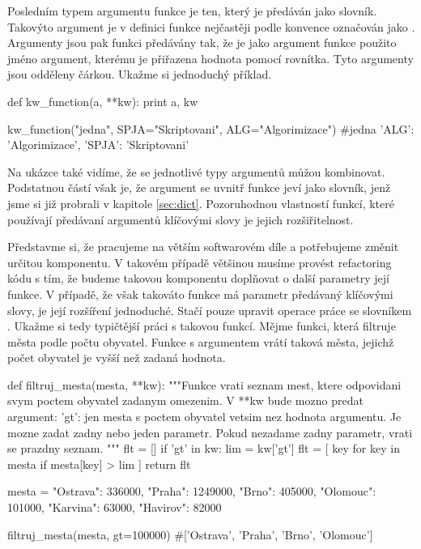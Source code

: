 Posledním typem argumentu funkce je ten, který je předáván jako slovník. Takovýto argument je
v definici funkce nejčastěji podle konvence označován jako . Argumenty jsou pak funkci
předávány tak, že je jako argument funkce použito jméno argument, kterému je přiřazena hodnota pomocí rovnítka.
Tyto argumenty jsou odděleny čárkou. Ukažme si jednoduchý příklad.

\begin{python}
def kw_function(a, **kw):
    print a, kw

kw_function("jedna", SPJA="Skriptovani", ALG="Algorimizace")
#jedna {'ALG': 'Algorimizace', 'SPJA': 'Skriptovani'}
\end{python}

Na ukázce také vidíme, že se jednotlivé typy argumentů můžou kombinovat. Podstatnou částí však je,
že argument  se uvnitř funkce jeví jako slovník, jenž jsme si již probrali v kapitole
\ref{sec:dict}. Pozoruhodnou vlastností funkcí, které používají předávaní argumentů klíčovými
slovy je jejich rozšiřitelnost.

Představme si, že pracujeme na větším softwarovém díle a potřebujeme změnit určitou
komponentu. V takovém případě většinou musíme provést refactoring kódu s tím, že budeme takovou
komponentu doplňovat o další parametry její funkce. V případě, že však takováto funkce má parametr
předávaný klíčovými slovy, je její rozšíření jednoduché. Stačí pouze upravit operace práce se
slovníkem . Ukažme si tedy typičtější práci s takovou funkcí. Mějme funkci, která filtruje
města podle počtu obyvatel. Funkce  s argumentem  vrátí taková města,
jejichž počet obyvatel je vyšší než zadaná hodnota.

\begin{python}
def filtruj_mesta(mesta, **kw):
    """Funkce vrati seznam mest, ktere odpovidani svym
    poctem obyvatel zadanym omezenim.
    V **kw bude mozno predat argument:
     'gt': jen mesta s poctem obyvatel vetsim nez hodnota argumentu.
    Je mozne zadat zadny nebo jeden parametr.
    Pokud nezadame zadny parametr, vrati se prazdny seznam.
    """
    flt = []
    if 'gt' in kw:
        lim = kw['gt']
        flt = [ key for key in mesta if mesta[key] > lim ]
    return flt

mesta = {"Ostrava": 336000, "Praha": 1249000,
         "Brno": 405000, "Olomouc": 101000,
         "Karvina": 63000, "Havirov": 82000}

filtruj_mesta(mesta, gt=100000)
#['Ostrava', 'Praha', 'Brno', 'Olomouc']
\end{python}

